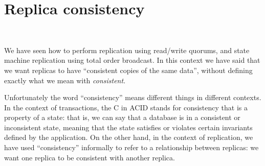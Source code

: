 
\section{Replica consistency}\label{sec:consistency}

\begin{frame}
    \begin{center}
        {\Large{\color{tumblue}{Replica consistency}}} \\[2em]
        \mydetails
    \end{center}
\end{frame}

We have seen how to perform replication using read/write quorums, and state machine replication using total order broadcast.
In this context we have said that we want replicas to have ``consistent copies of the same data'', without defining exactly what we mean with \emph{consistent}.

Unfortunately the word ``consistency'' means different things in different contexts.
In the context of transactions, the C in ACID stands for consistency that is a property of a state: that is, we can say that a database is in a consistent or inconsistent state, meaning that the state satisfies or violates certain invariants defined by the application.
On the other hand, in the context of replication, we have used ``consistency'' informally to refer to a relationship between replicas: we want one replica to be consistent with another replica.

